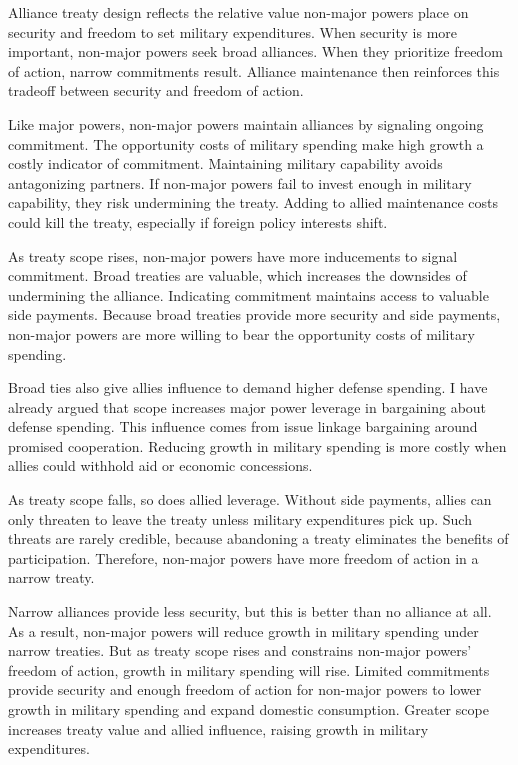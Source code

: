 \documentclass[12pt]{article}
\begin{document}
Alliance treaty design reflects the relative value non-major powers place on security and freedom to set military expenditures. 
When security is more important, non-major powers seek broad alliances.
When they prioritize freedom of action, narrow commitments result. 
Alliance maintenance then reinforces this tradeoff between security and freedom of action. 


Like major powers, non-major powers maintain alliances by signaling ongoing commitment. 
The opportunity costs of military spending make high growth a costly indicator of commitment. 
Maintaining military capability avoids antagonizing partners. 
If non-major powers fail to invest enough in military capability, they risk undermining the treaty. 
Adding to allied maintenance costs could kill the treaty, especially if foreign policy interests shift. 


As treaty scope rises, non-major powers have more inducements to signal commitment.
Broad treaties are valuable, which increases the downsides of undermining the alliance. 
Indicating commitment maintains access to valuable side payments.   
Because broad treaties provide more security and side payments, non-major powers are more willing to bear the opportunity costs of military spending. 


Broad ties also give allies influence to demand higher defense spending. 
I have already argued that scope increases major power leverage in bargaining about defense spending. 
This influence comes from issue linkage bargaining around promised cooperation. 
Reducing growth in military spending is more costly when allies could withhold aid or economic concessions. 


As treaty scope falls, so does allied leverage. 
Without side payments, allies can only threaten to leave the treaty unless military expenditures pick up. 
Such threats are rarely credible, because abandoning a treaty eliminates the benefits of participation. 
Therefore, non-major powers have more freedom of action in a narrow treaty.  


Narrow alliances provide less security, but this is better than no alliance at all. 
As a result, non-major powers will reduce growth in military spending under narrow treaties. 
But as treaty scope rises and constrains non-major powers' freedom of action, growth in military spending will rise. 
Limited commitments provide security and enough freedom of action for non-major powers to lower growth in military spending and expand domestic consumption. 
Greater scope increases treaty value and allied influence, raising growth in military expenditures. 
\end{document}

